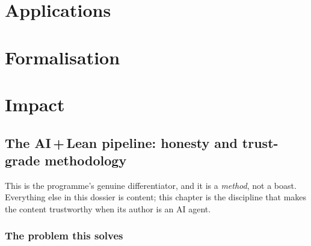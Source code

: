 \documentclass[11pt]{report}
\theoremstyle{plain}
\theoremstyle{definition}
\theoremstyle{remark}
\begin{document}
\part{Applications}













\part{Formalisation}









\part{Impact}



\chapter{The AI\,+\,Lean pipeline: honesty and trust-grade methodology}
\label{ch:pipeline}

This is the programme's genuine differentiator, and it is a \emph{method}, not a
boast. Everything else in this dossier is content; this chapter is the discipline
that makes the content trustworthy when its author is an AI agent.

\section{The problem this solves}\label{sec:pipeline-problem}
\end{document}
